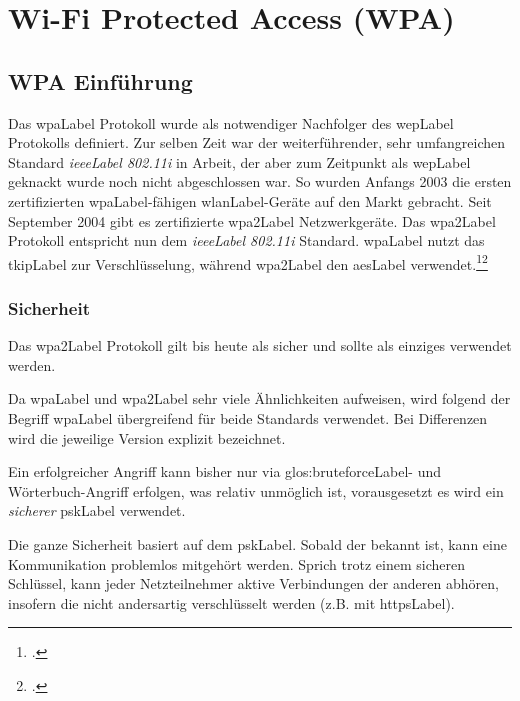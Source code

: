 \chapter{Wi-Fi Protected Access (WPA)}
\label{ch:wpa}

\section{WPA Einführung}
Das \gls{wpaLabel} Protokoll wurde als notwendiger Nachfolger des \gls{wepLabel} Protokolls definiert.
Zur selben Zeit war der weiterführender, sehr umfangreichen Standard \textit{\gls{ieeeLabel} 802.11i} in Arbeit, der aber zum Zeitpunkt als \gls{wepLabel} geknackt wurde noch nicht abgeschlossen war.
So wurden Anfangs 2003 die ersten zertifizierten \gls{wpaLabel}-fähigen \gls{wlanLabel}-Geräte auf den Markt gebracht.
Seit September 2004 gibt es zertifizierte \gls{wpa2Label} Netzwerkgeräte. Das \gls{wpa2Label} Protokoll entspricht nun dem \textit{\gls{ieeeLabel} 802.11i} Standard.
\gls{wpaLabel} nutzt das \gls{tkipLabel} zur Verschlüsselung, während \gls{wpa2Label} den \gls{aesLabel} verwendet.\footcite{Wi-Fi_Protected_Access__Wikipedia_2015-04-10}\footcite{WPA2__Wikipedia_2015-04-10}

\subsection{Sicherheit}
Das \gls{wpa2Label} Protokoll gilt bis heute als sicher und sollte als einziges verwendet werden.

Da \gls{wpaLabel} und \gls{wpa2Label} sehr viele Ähnlichkeiten aufweisen, wird folgend der Begriff \gls{wpaLabel} übergreifend für beide Standards verwendet. Bei Differenzen wird die jeweilige Version explizit bezeichnet.

Ein erfolgreicher Angriff kann bisher nur via \gls{glos:bruteforceLabel}- und Wörterbuch-Angriff erfolgen, was relativ unmöglich ist, vorausgesetzt es wird ein \textit{sicherer} \gls{pskLabel} verwendet.


Die ganze Sicherheit basiert auf dem \gls{pskLabel}.
Sobald der bekannt ist, kann eine Kommunikation problemlos mitgehört werden.
Sprich trotz einem sicheren Schlüssel, kann jeder Netzteilnehmer aktive Verbindungen der anderen abhören, insofern die nicht andersartig verschlüsselt werden (z.B. mit \gls{httpsLabel}).


